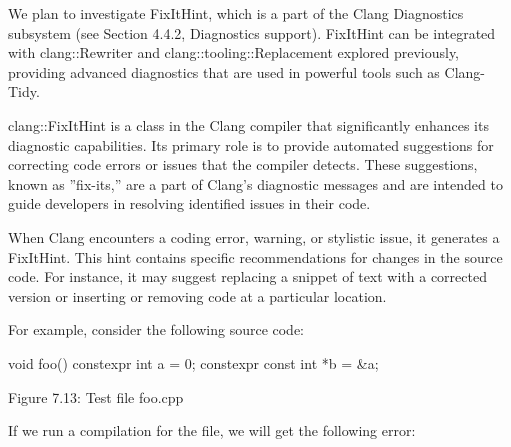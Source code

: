 We plan to investigate FixItHint, which is a part of the Clang Diagnostics subsystem (see Section 4.4.2, Diagnostics support). FixItHint can be integrated with clang::Rewriter and clang::tooling::Replacement explored previously, providing advanced diagnostics that are used in powerful tools such as Clang-Tidy.



clang::FixItHint is a class in the Clang compiler that significantly enhances its diagnostic capabilities. Its primary role is to provide automated suggestions for correcting code errors or issues that the compiler detects. These suggestions, known as ”fix-its,” are a part of Clang’s diagnostic messages and are intended to guide developers in resolving identified issues in their code.

When Clang encounters a coding error, warning, or stylistic issue, it generates a FixItHint. This hint contains specific recommendations for changes in the source code. For instance, it may suggest replacing a snippet of text with a corrected version or inserting or removing code at a particular location.

For example, consider the following source code:

\begin{cpp}
void foo() {
  constexpr int a = 0;
  constexpr const int *b = &a;
}
\end{cpp}

\begin{center}
Figure 7.13: Test file foo.cpp
\end{center}

If we run a compilation for the file, we will get the following error: